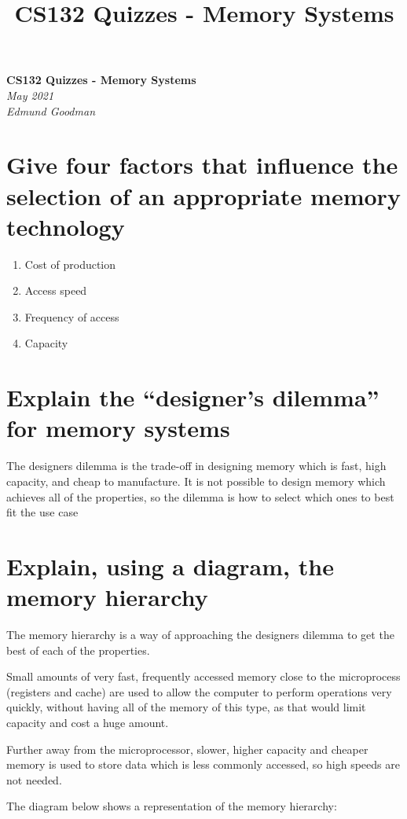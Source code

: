 \documentclass{article}
\title{CS132 Quizzes - Memory Systems}
\begin{document}
\begin{center}
    \Huge\textbf{CS132 Quizzes - Memory Systems}\\
    \huge\textit{May 2021}\\
    \medskip
    \Large\textit{Edmund Goodman}
\end{center}




\section{Give four factors that influence the selection of an appropriate memory
technology}

\begin{enumerate}
\item
  Cost of production
\item
  Access speed
\item
  Frequency of access
\item
  Capacity
\end{enumerate}


\section{Explain the ``designer's dilemma'' for memory systems}

The designers dilemma is the trade-off in designing memory which is fast, high
capacity, and cheap to manufacture. It is not possible to design memory which
achieves all of the properties, so the dilemma is how to select which ones to
best fit the use case


\section{Explain, using a diagram, the memory hierarchy}

The memory hierarchy is a way of approaching the designers dilemma to get the
best of each of the properties.

Small amounts of very fast, frequently accessed memory close to the microprocess
(registers and cache) are used to allow the computer to perform operations very
quickly, without having all of the memory of this type, as that would limit
capacity and cost a huge amount.

Further away from the microprocessor, slower, higher capacity and cheaper memory
is used to store data which is less commonly accessed, so high speeds are not
needed.

The diagram below shows a representation of the memory hierarchy:
\end{document}
